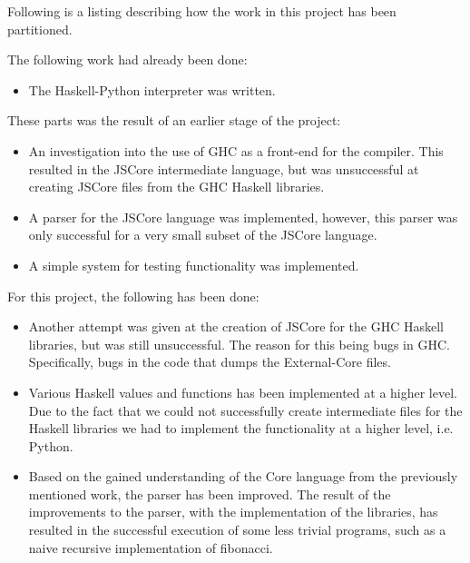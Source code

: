 Following is a listing describing how the work in this project has been
partitioned.

The following work had already been done:
\begin{itemize}

\item The Haskell-Python\cite{haskellpython} interpreter was written.

\end{itemize}

These parts was the result of an earlier stage of the project:
\begin{itemize}

\item An investigation into the use of GHC as a front-end for the compiler.
This resulted in the JSCore intermediate language, but was unsuccessful
at creating JSCore files from the GHC Haskell libraries.

\item A parser for the JSCore language was implemented, however, this 
parser was only successful for a very small subset of the JSCore language.

\item A simple system for testing functionality was implemented.

\end{itemize}

For this project, the following has been done:
\begin{itemize}

\item Another attempt was given at the creation of JSCore for the GHC 
Haskell libraries, but was still unsuccessful. The reason for this being
bugs in GHC. Specifically, bugs in the code that dumps the External-Core
files.

\item Various Haskell values and functions has been implemented at a higher
level. Due to the fact that we could not successfully create intermediate
files for the Haskell
libraries we had to implement the functionality at a higher level, i.e. 
Python.

\item Based on the gained understanding of the Core language from the
previously mentioned work, the parser has been improved. The result of 
the improvements to the parser, with the implementation of the libraries,
has resulted in the successful execution of some less trivial programs,
such as a naive recursive implementation of fibonacci.

\end{itemize}


